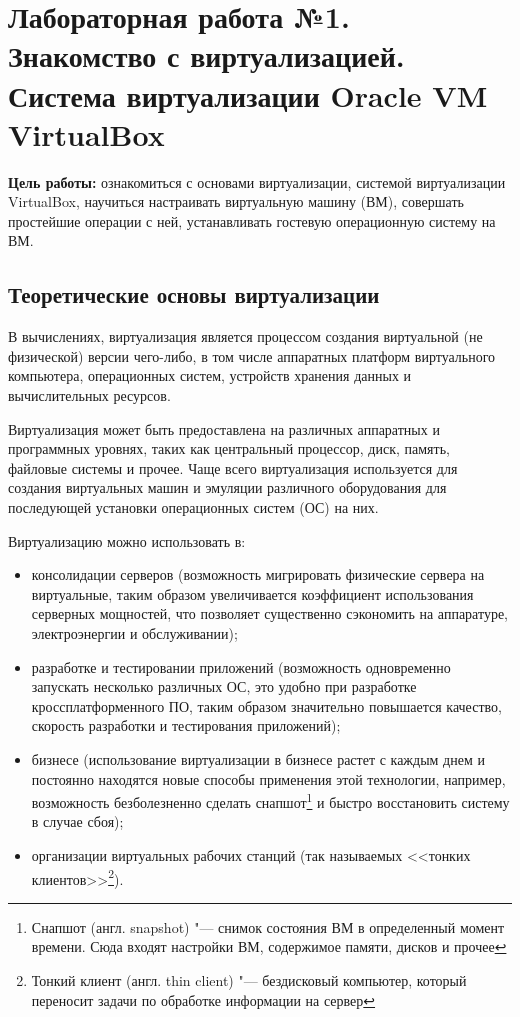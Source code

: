 \section[ЛР №1. Знакомство с виртуализацией, VirtualBox]{Лабораторная работа №1. \\
Знакомство с виртуализацией. Система виртуализации Oracle VM VirtualBox}

\textbf{Цель работы:} ознакомиться с основами виртуализации, системой виртуализации VirtualBox, научиться настраивать виртуальную машину (ВМ), совершать простейшие операции с ней, устанавливать гостевую операционную систему на ВМ.

\subsection{Теоретические основы виртуализации}

В вычислениях, виртуализация является процессом создания виртуальной (не физической) версии чего-либо, в том числе аппаратных платформ виртуального компьютера, операционных систем, устройств хранения данных и вычислительных ресурсов.

Виртуализация может быть предоставлена на различных аппаратных и программных уровнях, таких как центральный процессор, диск, память, файловые системы и прочее.
Чаще всего виртуализация используется для создания виртуальных машин и эмуляции различного оборудования для последующей установки операционных систем (ОС) на них.

Виртуализацию можно использовать в:
\begin{itemize}
    \item консолидации серверов (возможность мигрировать физические сервера на виртуальные, таким образом увеличивается коэффициент использования серверных мощностей, что позволяет существенно сэкономить на аппаратуре, электроэнергии и обслуживании);
    \item разработке и тестировании приложений (возможность одновременно запускать несколько различных ОС, это удобно при разработке кроссплатформенного ПО, таким образом значительно повышается качество, скорость разработки и тестирования приложений);
    \item бизнесе (использование виртуализации в бизнесе растет с каждым днем и постоянно находятся новые способы применения этой технологии, например, возможность безболезненно сделать снапшот\footnote{Снапшот (англ. snapshot) "--- снимок состояния ВМ в определенный момент времени. Сюда входят настройки ВМ, содержимое памяти, дисков и прочее} и быстро восстановить систему в случае сбоя);
    \item организации виртуальных рабочих станций (так называемых <<тонких клиентов>>\footnote{Тонкий клиент (англ. thin client) "--- бездисковый компьютер, который переносит задачи по обработке информации на сервер}).
\end{itemize}

